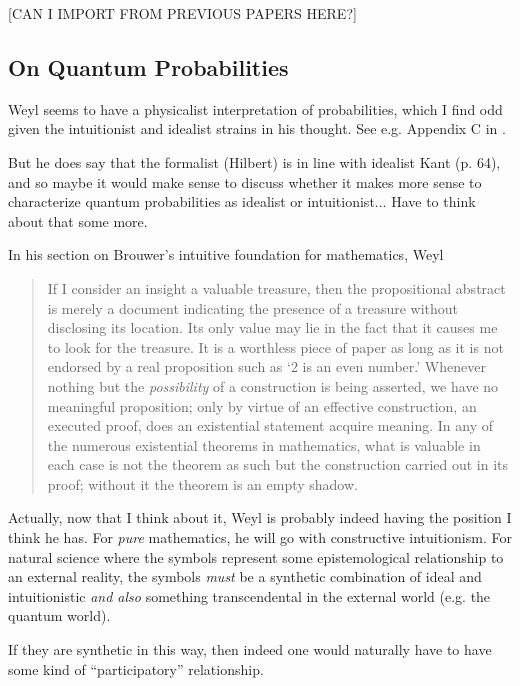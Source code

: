 [CAN I IMPORT FROM PREVIOUS PAPERS HERE?]



\subsection{On Quantum Probabilities}

Weyl seems to have a physicalist interpretation of probabilities, which I find odd given the intuitionist and idealist strains in his thought.  See e.g. Appendix C in \citep{Weyl1949}.

But he does say that the formalist (Hilbert) is in line with idealist Kant (p.  64), and so maybe it would make sense to  discuss whether it makes more sense to characterize quantum probabilities as idealist or intuitionist... Have to think about that some more.

In his section on Brouwer's intuitive foundation for mathematics, Weyl 

\begin{quote}
    If I consider an insight a valuable treasure, then the propositional abstract is merely a document indicating the presence of a treasure without disclosing its location.  Its only value may lie in the fact that it causes me to look for the treasure.  It is a worthless piece of paper as long as it is not endorsed by a real proposition such as `2 is an even number.'  Whenever nothing but the \emph{possibility} of a construction is being asserted, we have no meaningful proposition; only by virtue of an effective construction, an executed proof, does an existential statement acquire meaning.  In any of the numerous existential theorems in mathematics, what is valuable in each case is not the theorem as such but the construction carried out in its proof; without it the theorem is an empty shadow.

    \citep[p. 51]{Weyl1949}
\end{quote}

Actually, now that I think about it, Weyl is probably indeed having the position I think he has.  For \emph{pure} mathematics, he will go with constructive intuitionism.  For natural science where the symbols represent some epistemological relationship to an external reality, the symbols \emph{must} be a synthetic combination of ideal and intuitionistic \emph{and also} something transcendental in the external world (e.g. the quantum world).  

If they are synthetic in this way, then indeed one would naturally have to have some kind of ``participatory'' relationship.


